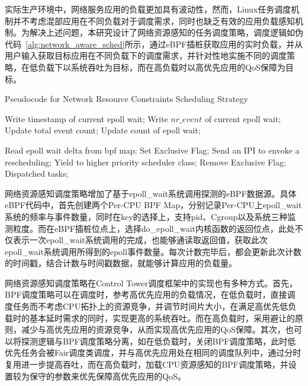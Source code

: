 实际生产环境中，网络服务应用的负载更加具有波动性，然而，Linux任务调度机制并不考虑混部应用在不同负载对于调度需求，同时也缺乏有效的应用负载感知机制。为解决上述问题，本研究设计了网络资源感知的任务调度策略，调度逻辑如伪代码~\ref{alg:network_aware_sched}所示，通过eBPF插桩获取应用的实时负载，并从用户输入获取目标应用在不同负载下的调度需求，并针对性地实施不同的调度策略，在低负载下以系统吞吐为目标，而在高负载时以高优先应用的QoS保障为目标。

\begin{algorithm}[H]
    \caption{Pseudocode for Network Resource Constraints Scheduling Strategy}
    \label{alg:network_aware_sched}
    \begin{algorithmic}[1]

        \State Write timestamp of current epoll wait;
        \State Write $nr\_event$ of current epoll wait;
        \State Update total event count;
        \State Update count of epoll wait;
    \EndFunction

            \State Read epoll wait delta from bpf map;
                \State Set Exclusive Flag;
                    \State Send an IPI to envoke a rescheduling;
                \EndFor
                \State Yield to higher priority scheduler class;
            \EndIf
            \State Remove Exclusive Flag;
            \State Dispatched tasks;
        \EndWhile
    \EndFunction
    \end{algorithmic}
\end{algorithm}

网络资源感知调度策略增加了基于epoll\_wait系统调用探测的eBPF数据源。具体eBPF代码中，首先创建两个Per-CPU BPF Map，分别记录Per-CPU上epoll\_wait系统的频率与事件数量，同时在key的选择上，支持pid、Cgroup以及系统三种监测粒度。而在eBPF插桩位点上，选择do\_epoll\_wait内核函数的返回位点，此处不仅表示一次epoll\_wait系统调用的完成，也能够通读取返回值，获取此次epoll\_wait系统调用所得到的epoll事件数量。每次计数完毕后，都会更新此次计数的时间戳，结合计数与时间戳数据，就能够计算应用的负载量。

网络资源感知调度策略在Control Tower调度框架中的实现也有多种方式。首先，BPF调度策略可以在调度时，参考高优先应用的负载情况，在低负载时，直接调度任务而不考虑CPU拓扑上的资源竞争，并调节时间片大小，在满足高优先低负载时的基本延时需求的同时，实现更高的系统吞吐。而在高负载时，采用避让的原则，减少与高优先应用的资源竞争，从而实现高优先应用的QoS保障。其次，也可以将探测逻辑与BPF调度策略分离，如在低负载时，关闭BPF调度策略，此时低优先任务会被Fair调度类调度，并与高优先应用处在相同的调度队列中，通过分时复用进一步提高吞吐，而在高负载时，加载CPU资源感知的BPF调度策略，并设置较为保守的参数来优先保障高优先应用的QoS。

